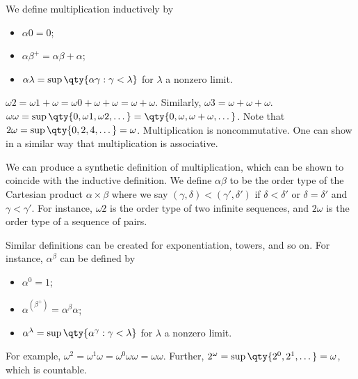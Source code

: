 We define multiplication inductively by
\begin{itemize}
    \item $\alpha 0 = 0$;
    \item $\alpha \beta^+ = \alpha\beta + \alpha$;
    \item $\alpha \lambda = \sup\qty{\alpha \gamma : \gamma < \lambda}$ for $\lambda$ a nonzero limit.
\end{itemize}
\begin{example}
    $\omega 2 = \omega 1 + \omega = \omega 0 + \omega + \omega = \omega + \omega$.
    Similarly, $\omega 3 = \omega + \omega + \omega$.
    $\omega \omega = \sup\qty{0, \omega 1, \omega 2, \dots} = \qty{0, \omega, \omega + \omega, \dots}$.
    Note that $2 \omega = \sup\qty{0, 2, 4, \dots} = \omega$.
    Multiplication is noncommutative.
    One can show in a similar way that multiplication is associative.
\end{example}
We can produce a synthetic definition of multiplication, which can be shown to coincide with the inductive definition.
We define $\alpha \beta$ to be the order type of the Cartesian product $\alpha \times \beta$ where we say $(\gamma, \delta) < (\gamma', \delta')$ if $\delta < \delta'$ or $\delta = \delta'$ and $\gamma < \gamma'$.
For instance, $\omega 2$ is the order type of two infinite sequences, and $2 \omega$ is the order type of a sequence of pairs.

Similar definitions can be created for exponentiation, towers, and so on.
For instance, $\alpha^\beta$ can be defined by
\begin{itemize}
    \item $\alpha^0 = 1$;
    \item $\alpha^{(\beta^+)} = \alpha^\beta \alpha$;
    \item $\alpha^\lambda = \sup\qty{\alpha^\gamma : \gamma < \lambda}$ for $\lambda$ a nonzero limit.
\end{itemize}
For example, $\omega^2 = \omega^1 \omega = \omega^0 \omega \omega = \omega \omega$.
Further, $2^\omega = \sup\qty{2^0, 2^1, \dots} = \omega$, which is countable.
